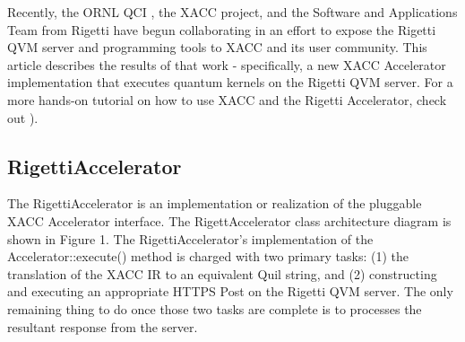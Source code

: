 \documentclass[letterpaper,10pt,english]{sphinxmanual}
\begin{document}
Recently, the ORNL QCI , the XACC project,
and the Software and Applications Team from Rigetti have begun collaborating in
an effort to expose the Rigetti QVM server and programming tools to XACC and its user
community. This article describes the results of that work - specifically, a
new XACC Accelerator implementation that executes quantum kernels on the
Rigetti QVM server. For a more hands-on tutorial on how to use XACC and the Rigetti
Accelerator, check out ).


\subsection{RigettiAccelerator}
\label{\detokenize{plugins:rigettiaccelerator}}
The RigettiAccelerator is an implementation or realization of the pluggable
XACC Accelerator interface. The RigettAccelerator class architecture diagram is
shown in Figure 1. The RigettiAccelerator’s implementation of the Accelerator::execute() method
is charged with two primary tasks: (1) the translation of the XACC IR to an equivalent
Quil string, and (2) constructing and executing an
appropriate HTTPS Post on the Rigetti QVM server. The only remaining
thing to do once those two tasks are complete is to processes the resultant response from the server.

\noindent{}
\end{document}

